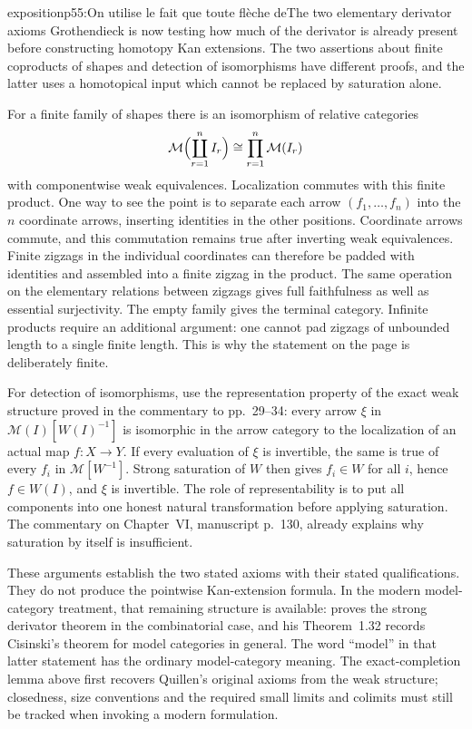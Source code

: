 \begin{dcomment}{exposition}{p55:On utilise le fait que toute flèche de}{The two elementary derivator axioms}
Grothendieck is now testing how much of the derivator is already present before constructing homotopy Kan extensions. The two assertions about finite coproducts of shapes and detection of isomorphisms have different proofs, and the latter uses a homotopical input which cannot be replaced by saturation alone.

For a finite family of shapes there is an isomorphism of relative categories
\[
 \mathcal M\Bigl(\coprod_{r=1}^n I_r\Bigr)
 \cong\prod_{r=1}^n\mathcal M(I_r)
\]
with componentwise weak equivalences. Localization commutes with this finite product. One way to see the point is to separate each arrow $(f_1,\ldots,f_n)$ into the $n$ coordinate arrows, inserting identities in the other positions. Coordinate arrows commute, and this commutation remains true after inverting weak equivalences. Finite zigzags in the individual coordinates can therefore be padded with identities and assembled into a finite zigzag in the product. The same operation on the elementary relations between zigzags gives full faithfulness as well as essential surjectivity. The empty family gives the terminal category. Infinite products require an additional argument: one cannot pad zigzags of unbounded length to a single finite length. This is why the statement on the page is deliberately finite.

For detection of isomorphisms, use the representation property of the exact weak structure proved in the commentary to pp.~29--34: every arrow $\xi$ in $\mathcal M(I)[W(I)^{-1}]$ is isomorphic in the arrow category to the localization of an actual map $f:X\to Y$. If every evaluation of $\xi$ is invertible, the same is true of every $f_i$ in $\mathcal M[W^{-1}]$. Strong saturation of $W$ then gives $f_i\in W$ for all $i$, hence $f\in W(I)$, and $\xi$ is invertible. The role of representability is to put all components into one honest natural transformation before applying saturation. The commentary on Chapter~VI, manuscript p.~130, already explains why saturation by itself is insufficient.

These arguments establish the two stated axioms with their stated qualifications. They do not produce the pointwise Kan-extension formula. In the modern model-category treatment, that remaining structure is available: \citet[Proposition~1.30]{Groth2013} proves the strong derivator theorem in the combinatorial case, and his Theorem~1.32 records Cisinski's theorem for model categories in general. The word ``model'' in that latter statement has the ordinary model-category meaning. The exact-completion lemma above first recovers Quillen's original axioms from the weak structure; closedness, size conventions and the required small limits and colimits must still be tracked when invoking a modern formulation.
\end{dcomment}


